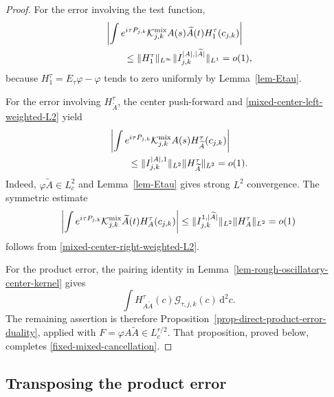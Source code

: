 \documentclass[a4paper,11pt]{article}
\newcommand{\dd}{\,\text{d}}
\theoremstyle{plain}
\theoremstyle{definition}
\theoremstyle{remark}
\begin{document}
\begin{proof}
For the error involving the test function,
\begin{align}
 &\left|\int e^{i\tau P_{j,k}}\mathcal K_{j,k}^{\rm mix}
 A(s)\widetilde A(t)H_1^\tau(c_{j,k})\right|
 \notag\\
 &\qquad\leq
 \|H_1^\tau\|_{L^\infty}
 \|I_{j,k}^{|A|,|\widetilde A|}\|_{L^1}=o(1),
 \label{fixed-mixed-smooth-test-error}
\end{align}
because $H_1^\tau=E_\tau\varphi-\varphi$ tends to zero uniformly by
Lemma~\ref{lem-Etau}.

For the error involving $H_{\widetilde A}^\tau$, the center push-forward and \eqref{mixed-center-left-weighted-L2} yield
\begin{align}
 &\left|\int e^{i\tau P_{j,k}}\mathcal K_{j,k}^{\rm mix}
 A(s)H_{\widetilde A}^\tau(c_{j,k})\right|
 \notag\\
 &\qquad\leq
 \|I_{j,k}^{|A|,1}\|_{L^2}
 \|H_{\widetilde A}^\tau\|_{L^2}=o(1).
 \label{fixed-mixed-left-one-factor-error}
\end{align}
Indeed, $\varphi\widetilde A\in L^2_c$ and Lemma~\ref{lem-Etau} gives strong
$L^2$ convergence.  The symmetric estimate
\begin{equation}\label{fixed-mixed-right-one-factor-error}
 \left|\int e^{i\tau P_{j,k}}\mathcal K_{j,k}^{\rm mix}
 \widetilde A(t)H_A^\tau(c_{j,k})\right|
 \leq
 \|I_{j,k}^{1,|\widetilde A|}\|_{L^2}
 \|H_A^\tau\|_{L^2}=o(1)
\end{equation}
follows from \eqref{mixed-center-right-weighted-L2}.

For the product error, the pairing identity in Lemma~\ref{lem-rough-oscillatory-center-kernel} gives
\[
        \int H_{A\widetilde A}^\tau(c)\mathcal G_{\tau,j,k}(c)\dd^2c.
\]
The remaining assertion is therefore Proposition~\ref{prop-direct-product-error-duality}, applied with $F=\varphi A\widetilde A\in L^{r/2}_c$. That proposition, proved below, completes \eqref{fixed-mixed-cancellation}.
\end{proof}


\subsection{Transposing the product error}\label{subsec-product-error}
\end{document}
